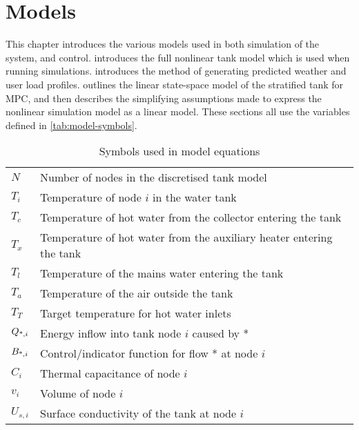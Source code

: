 \chapter{Models}
\label{ch:models}

This chapter introduces the various models used in both simulation of the system, and control.
 introduces the full nonlinear tank model which is used when running simulations.
 introduces the method of generating predicted weather and user load profiles.
 outlines the linear state-space model of the stratified tank for MPC, and then describes the simplifying assumptions made to express the nonlinear simulation model as a linear model.
These sections all use the variables defined in \autoref{tab:model-symbols}.

\begin{table}
   \caption{Symbols used in model equations}
   \label{tab:model-symbols}
   \begin{center}
   \begin{tabular}{l l}
      \toprule
      $N$ & Number of nodes in the discretised tank model \\
      $T_i$ & Temperature of node $i$ in the water tank \\
      $T_c$ & Temperature of hot water from the collector entering the tank \\
      $T_x$ & Temperature of hot water from the auxiliary heater entering the tank \\
      $T_l$ & Temperature of the mains water entering the tank \\
      $T_a$ & Temperature of the air outside the tank \\
      $T_T$ & Target temperature for hot water inlets \\
      $Q_{\text{*}, i}$ & Energy inflow into tank node $i$ caused by * \\
      $B_{\text{*}, i}$ & Control/indicator function for flow * at node $i$ \\
      $C_i$ & Thermal capacitance of node $i$ \\
      $v_i$ & Volume of node $i$ \\
      $U_{s, i}$ & Surface conductivity of the tank at node $i$ \\
      \bottomrule
   \end{tabular}
   \end{center}
\end{table}

